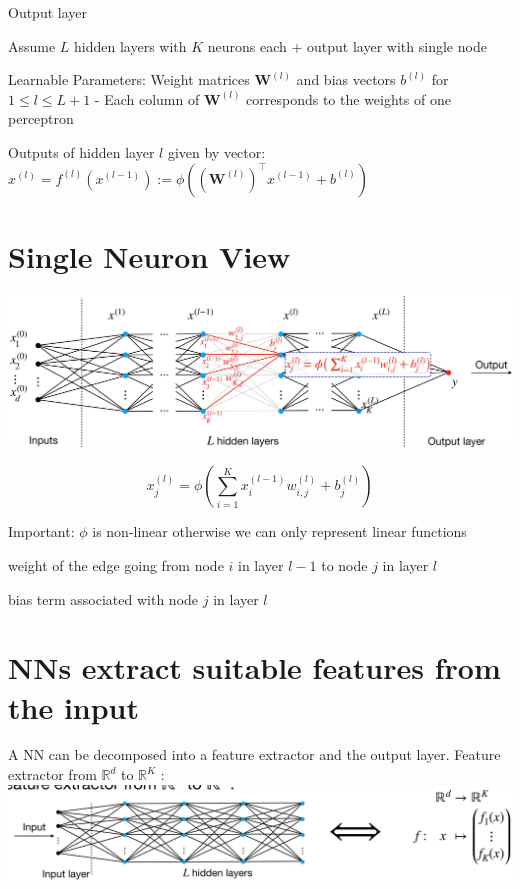 \documentclass[10pt]{article}
\begin{document}
Output layer

Assume $L$ hidden layers with $K$ neurons each + output layer with single node

Learnable Parameters: Weight matrices $\mathbf{W}^{(l)}$ and bias vectors $b^{(l)}$ for $1 \leq l \leq L+1$ - Each column of $\mathbf{W}^{(l)}$ corresponds to the weights of one perceptron

Outputs of hidden layer $l$ given by vector: $x^{(l)}=f^{(l)}\left(x^{(l-1)}\right):=\phi\left(\left(\mathbf{W}^{(l)}\right)^{\top} x^{(l-1)}+b^{(l)}\right)$

\section*{Single Neuron View}
\begin{center}
\includegraphics[max width=\textwidth]{2024_01_08_0e0dcffe4bc8c6049046g-09}
\end{center}

$$
x_{j}^{(l)}=\phi\left(\sum_{i=1}^{K} x_{i}^{(l-1)} w_{i, j}^{(l)}+b_{j}^{(l)}\right)
$$

Important: $\phi$ is non-linear otherwise we can only represent linear functions

weight of the edge going from node $i$ in layer $l-1$ to node $j$ in layer $l$

bias term associated with node $j$ in layer $l$

\section*{NNs extract suitable features from the input}
A NN can be decomposed into a feature extractor and the output layer. Feature extractor from $\mathbb{R}^{d}$ to $\mathbb{R}^{K}$ :
\includegraphics[max width=\textwidth, center]{2024_01_08_0e0dcffe4bc8c6049046g-10}
\end{document}
